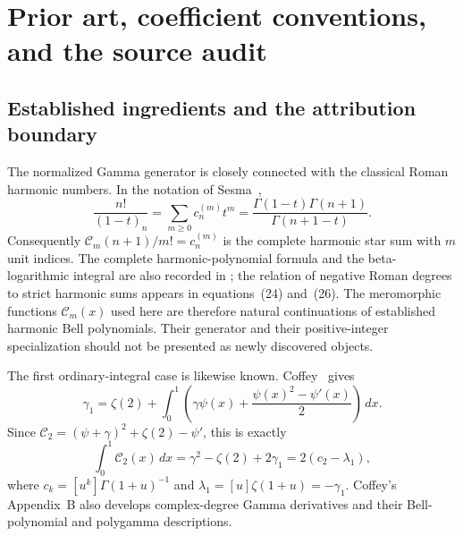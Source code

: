 \section{Prior art, coefficient conventions, and the source audit}
\label{sec:normalizer-prior-art-audit}

\subsection{Established ingredients and the attribution boundary}

The normalized Gamma generator is closely connected with the
classical Roman harmonic numbers.  In the notation of
Sesma~\cite[Proposition~3(a), equation~(49)]{Sesma},
\begin{equation}
 \frac{n!}{(1-t)_n}=\sum_{m\geq0}c_n^{(m)}t^m
       =\frac{\Gamma(1-t)\Gamma(n+1)}{\Gamma(n+1-t)}.
 \label{eq:audit-roman-generator}
\end{equation}
Consequently $\mathcal C_m(n+1)/m!=c_n^{(m)}$ is the complete harmonic
star sum with $m$ unit indices.  The complete harmonic-polynomial
formula and the beta-logarithmic integral are also recorded in
\cite[equations~(29)--(30)]{Sesma}; the relation of negative Roman
degrees to strict harmonic sums appears in equations~(24) and~(26).
The meromorphic functions $\mathcal C_m(x)$ used here are therefore natural
continuations of established harmonic Bell polynomials.  Their
generator and their positive-integer specialization should not
be presented as newly discovered objects.

The first ordinary-integral case is likewise known.
Coffey~\cite[Proposition~3(b), equation~(1.19)]{Coffey} gives
\begin{equation}
 \gamma_1=\zeta(2)+\int_0^1
       \left(\gamma\psi(x)
          +\frac{\psi(x)^2-\psi'(x)}{2}\right)\,dx.
 \label{eq:audit-coffey-first-case}
\end{equation}
Since $\mathcal C_2=(\psi+\gamma)^2+\zeta(2)-\psi'$, this is exactly
\begin{equation}
 \int_0^1 \mathcal C_2(x)\,dx
       =\gamma^2-\zeta(2)+2\gamma_1
       =2(c_2-\lambda_1),
 \label{eq:audit-coffey-normalized-case}
\end{equation}
where $c_k=[u^k]\Gamma(1+u)^{-1}$ and
$\lambda_1=[u]\zeta(1+u)=-\gamma_1$.
Coffey's Appendix~B also develops complex-degree Gamma derivatives
and their Bell-polynomial and polygamma descriptions.

